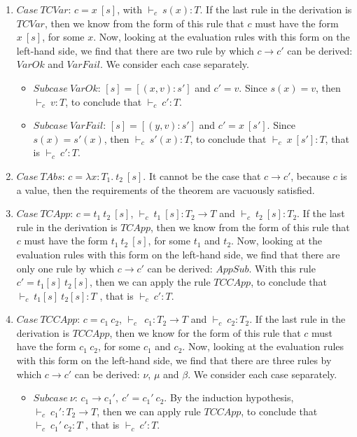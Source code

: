 \documentclass {article}
\newcommand{\tto}{\longrightarrow}
\newcommand{\absD}{\lambda x:T_1. \ t_2}
\newcommand{\subx}{[(x,v):s']}
\newcommand{\suby}{[(y,v):s']}
\newcommand{\tyC}{{\vdash_c \ }}
\begin{document}
\begin{enumerate}
\item $Case \ TCVar$: $c = x \ [s]$, with $\tyC s(x):T$. If the last rule in the derivation is $TCVar$, then we know from the form of this rule that $c$ must have the form $x \ [s]$, for some $x$. Now, looking at the evaluation rules with this form on the left-hand side, we find that there are two rule by which $c \tto c'$ can be derived: $VarOk$ and $VarFail$. We consider each case separately.
\begin{itemize}
\item $Subcase \ VarOk$: $[s] = \subx$ and $c' = v$. Since $s(x) = v$, then  $\tyC v : T$, to conclude that $\tyC c' : T$.

\item $Subcase \ VarFail$: $[s] = \suby$ and $c' = x \ [s']$. Since $s(x) = s'(x)$, then $\tyC s'(x) : T$, to conclude that $\tyC x \ [s']:T $, that is $\tyC c' : T$. 
\end{itemize}


\item $Case \ TAbs$: $c = \absD \ [s]$. It cannot be the case that $c \tto c'$, because $c$ is a value, then the requirements of the theorem are vacuously satisfied. 

\item $Case \ TCApp$: $c = t_1 \ t_2 \ [s]$, $\tyC t_1 \ [s]: T_2 \to T$ and $\tyC t_2 \ [s]: T_2$. If the last rule in the derivation is $TCApp$, then we know from the form of this rule that $c$ must have the form $t_1 \ t_2 \ [s]$, for some $t_1$ and $t_2$. Now, looking at the evaluation rules with this form on the left-hand side, we find that there are only one rule by which $c \tto c'$ can be derived: $AppSub$. With this rule $c' = t_1[s] \ t_2[s]$, then we can apply the rule $TCCApp$, to conclude that $\tyC t_1[s] \ t_2[s]: T$ , that is $\tyC c' : T$. 

\item $Case \ TCCApp$: $c = c_1 \ c_2$, $\tyC \ c_1 : T_2 \to T$ and $\tyC c_2 : T_2$. If the last rule in the derivation is $TCCApp$, then we know for the form of this rule that $c$ must have the form $c_1 \ c_2$, for some $c_1$ and $c_2$. Now, looking at the evaluation rules with this form on the left-hand side, we find that there are three rules by which $c \tto c'$ can be derived: $\nu$, $\mu$ and $\beta$. We consider each case separately.
\begin{itemize}

\item $Subcase \ \nu$: $c_1 \tto c_1', \ c' = c_1' \ c_2$. By the induction hypothesis, $\tyC c_1' : T_2 \to T$, then we can apply rule $TCCApp$, to conclude that $\tyC c_1' \ c_2: T$ , that is $\tyC c' : T$.


\end{itemize}
\end{enumerate}
\end{document}
